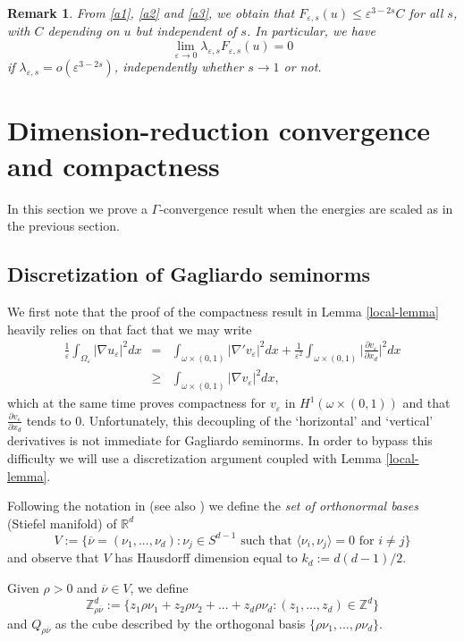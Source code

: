 \documentclass{article}
\newtheorem{remark}[lemma]{Remark}
\newcommand{\e}{\varepsilon}
\begin{document}
\begin{remark}\label{rem-nd}\rm
From \eqref{a1}, \eqref{a2} and \eqref{a3}, we obtain that $F_{\e,s}(u)\le\e^{3-2s} C$ for all $s$, with $C$ depending on $u$ but independent of $s$. In particular, we have
\begin{equation}\label{a4}
\lim_{\e\to 0} \lambda_{\e,s}F_{\e,s}(u)=0
\end{equation}
if $\lambda_{\e,s}=o(\e^{3-2s})$, independently whether $s\to 1$ or not.
\end{remark}

\section{Dimension-reduction convergence and compactness}

In this section we prove a $\Gamma$-convergence result when the energies are scaled as in the previous section.

\subsection{Discretization of Gagliardo seminorms}
We first note that the proof of the compactness result in Lemma \ref{local-lemma}
heavily relies on that fact that we may write
\begin{eqnarray*}
\frac1\e\int_{\Omega_\e} |\nabla u_\e|^2dx&=&\int_{\omega\times(0,1)}|\nabla' v_\e|^2dx+\frac1{\e^2} \int_{\omega\times(0,1)}\Big|\frac{\partial v_\e}{\partial x_d}\Big|^2dx\\
&\ge& \int_{\omega\times(0,1)}|\nabla v_\e|^2dx,
\end{eqnarray*}
which at the same time proves compactness for $v_\e$ in $H^1(\omega\times (0,1))$ and that $\frac{\partial v_\e}{\partial x_d}$ tends to $0$.
Unfortunately, this decoupling of the `horizontal' and `vertical' derivatives is not immediate for Gagliardo seminorms.
In order to bypass this difficulty we will use a discretization argument coupled with Lemma \ref{local-lemma}.

\smallskip
Following the notation in \cite{Solci-vortices} (see also \cite{BBD}) we define the {\em set of orthonormal bases} (Stiefel manifold) of $\mathbb{R}^d$
\[
V:=\{\overline{\nu}=(\nu_1,...,\nu_d) : \nu_j \in S^{d-1} \text{ such that } \langle\nu_i, \nu_j\rangle=0 \text{ for } i\neq j \}
\]
and observe that $V$ has Hausdorff dimension equal to $k_d:=d(d-1)/2$. 

Given $\rho>0$ and $\overline{\nu}\in V$, we define $$\mathbb Z^d_{\rho\overline{\nu}}:=\{z_1\rho\nu_1+z_2\rho\nu_2+...+z_d\rho\nu_d : (z_1,...,z_d)\in \mathbb Z^d\}$$ and $Q_{\rho\overline{\nu}}$ as the cube described by the orthogonal basis $\{\rho\nu_1,...,\rho\nu_d\}$.
\end{document}

